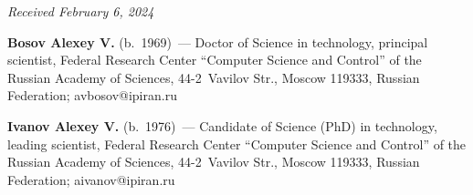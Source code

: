 \vspace*{-6pt}

\hfill{\small\textit{Received February 6, 2024}} 

\vspace*{-12pt}


\Contr

\vspace*{-3pt}

\noindent
\textbf{Bosov Alexey V.} (b.\ 1969)~--- Doctor of Science in technology, principal scientist, Federal 
Research Center ``Computer Science and Control'' of the Russian Academy of Sciences, 44-2~Vavilov 
Str., Moscow 119333, Russian Federation; \mbox{avbosov@ipiran.ru}

\vspace*{3pt}

\noindent
\textbf{Ivanov Alexey V.} (b.\ 1976)~--- Candidate of Science (PhD) in technology, leading scientist, 
Federal Research Center ``Computer Science and Control'' of the Russian Academy of Sciences,  
44-2~Vavilov Str., Moscow 119333, Russian Federation; \mbox{aivanov@ipiran.ru}





\label{end\stat}

\renewcommand{\bibname}{\protect\rm Литература} 